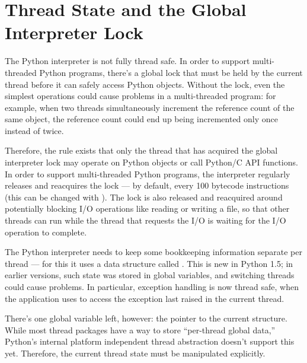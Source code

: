 
\section{Thread State and the Global Interpreter Lock
         \label{threads}}


The Python interpreter is not fully thread safe.  In order to support
multi-threaded Python programs, there's a global lock that must be
held by the current thread before it can safely access Python objects.
Without the lock, even the simplest operations could cause problems in
a multi-threaded program: for example, when two threads simultaneously
increment the reference count of the same object, the reference count
could end up being incremented only once instead of twice.

Therefore, the rule exists that only the thread that has acquired the
global interpreter lock may operate on Python objects or call Python/C
API functions.  In order to support multi-threaded Python programs,
the interpreter regularly releases and reacquires the lock --- by
default, every 100 bytecode instructions (this can be changed with
).  The lock is also released and
reacquired around potentially blocking I/O operations like reading or
writing a file, so that other threads can run while the thread that
requests the I/O is waiting for the I/O operation to complete.

The Python interpreter needs to keep some bookkeeping information
separate per thread --- for this it uses a data structure called
.  This is new in Python
1.5; in earlier versions, such state was stored in global variables,
and switching threads could cause problems.  In particular, exception
handling is now thread safe, when the application uses
 to access the exception last raised in the
current thread.

There's one global variable left, however: the pointer to the current
 structure.  While most
thread packages have a way to store ``per-thread global data,''
Python's internal platform independent thread abstraction doesn't
support this yet.  Therefore, the current thread state must be
manipulated explicitly.

